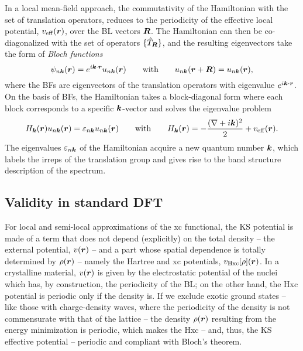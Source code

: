 In a local mean-field approach, the commutativity of the Hamiltonian with the set of translation operators, reduces to the periodicity of the effective local potential, $v_{\rm eff}({\bm r})$, over the BL vectors ${\bm R}$. The Hamiltonian can then be co-diagonalized with the set of operators $\{ \hat{T}_{{\bm R}} \}$, and the resulting eigenvectors take the form of \emph{Bloch functions}
%
\begin{equation}
    \psi_{n{\bm k}}({\bm r}) = e^{i{\bm k} \cdot {\bm r}} u_{n{\bm k}}({\bm r})
    \qquad \text{with} \qquad
    u_{n{\bm k}}({\bm r}+{\bm R}) = u_{n{\bm k}}({\bm r}) ,
    \label{eq:bloch-functions}
\end{equation}
%
where the BFs are eigenvectors of the translation operators with eigenvalue $e^{i{\bm k} \cdot {\bm r}}$. On the basis of BFs, the Hamiltonian takes a block-diagonal form where each block corresponds to a specific ${\bm k}$-vector and solves the eigenvalue problem
%
\begin{equation}
    H_{{\bm k}}({\bm r}) u_{n{\bm k}}({\bm r}) = \varepsilon_{n{\bm k}} u_{n{\bm k}}({\bm r})
    \qquad \text{with} \qquad
    H_{{\bm k}}({\bm r}) = - \frac{(\nabla + i{\bm k})^2}{2} + v_{\rm eff}({\bm r}) .
    \label{eq:k-block-crystal-ham}
\end{equation}
%
The eigenvalues $\varepsilon_{n{\bm k}}$ of the Hamiltonian acquire a new quantum number ${\bm k}$, which labels the irreps of the translation group and gives rise to the band structure description of the spectrum.

\subsection{Validity in standard DFT\label{sec:bloch-th-dft}}
For local and semi-local approximations of the xc functional, the KS potential is made of a term that does not depend (explicitly) on the total density -- the external potential, $v({\bm r})$ -- and a part whose spatial dependence is totally determined by $\rho({\bm r})$ -- namely the Hartree and xc potentials, $v_{\rm Hxc}[\rho]({\bm r})$. In a crystalline material, $v({\bm r})$ is given by the electrostatic potential of the nuclei which has, by construction, the periodicity of the BL; on the other hand, the Hxc potential is periodic only if the density is. If we exclude exotic ground states -- like those with charge-density waves, where the periodicity of the density is not commensurate with that of the lattice -- the density $\rho({\bm r})$ resulting from the energy minimization is periodic, which makes the Hxc -- and, thus, the KS effective potential -- periodic and compliant with Bloch's theorem.

